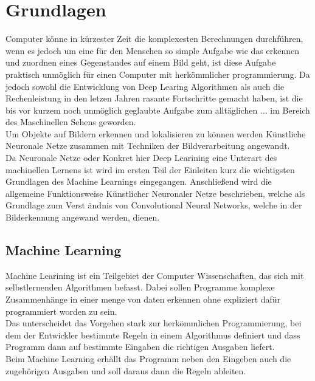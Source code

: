 \chapter{Grundlagen}\label{kap:grundlagen}



Computer könne in kürzester Zeit die komplexesten Berechnungen durchführen, wenn es jedoch um eine für den Menschen so 
simple Aufgabe wie das erkennen und zuordnen eines Gegenstandes auf einem Bild geht, ist diese Aufgabe praktisch 
unmöglich für einen Computer mit herkömmlicher programmierung. Da jedoch sowohl die Entwicklung von Deep Learing 
Algorithmen als auch die Rechenleistung in den letzen Jahren rasante Fortschritte gemacht haben, ist die bis vor kurzem 
noch unmöglich geglaubte Aufgabe zum alltäglichen ... im Bereich des Maschinellen Sehens geworden.\\

Um Objekte auf Bildern erkennen und lokalisieren zu können werden Künstliche Neuronale Netze zusammen mit 
Techniken der Bildverarbeitung angewandt.\\


Da Neuronale Netze oder Konkret hier Deep Learining eine Unterart des machinellen Lernens ist wird im ersten Teil der 
Einleiten kurz die wichtigsten Grundlagen des Machine Learnings eingegangen.
Anschließend wird die allgemeine Funktionsweise Künstlicher Neuronaler Netze beschrieben, welche als Grundlage zum Verst
ändnis von Convolutional Neural Networks, welche in der Bilderkennung angewand werden, dienen.  





\section{Machine Learning}\label{sec:ml}


Machine Learining ist ein Teilgebiet der Computer Wissenschaften, das sich mit selbstlernenden
Algorithmen befasst. Dabei sollen Programme komplexe Zusammenhänge in einer menge von daten erkennen ohne 
expliziert dafür programmiert worden zu sein.
\\
Das unterscheidet das Vorgehen stark zur herkömmlichen Programmierung, bei dem der Entwickler bestimmte 
Regeln in einem Algorithmus definiert und dass Programm dann auf bestimmte Eingaben die richtigen Ausgaben liefert.
\\
Beim Machine Learning erhällt das Programm neben den Eingeben auch die zugehörigen Ausgaben und soll daraus dann die 
Regeln ableiten.


